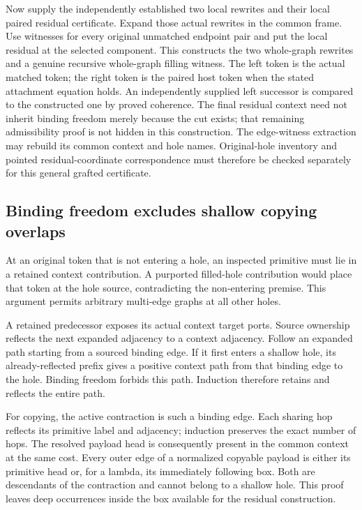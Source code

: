 Now supply the independently established two local rewrites and their local
paired residual certificate. Expand those actual rewrites in the common
frame. Use witnesses for every original unmatched endpoint pair and put the local residual
at the selected component. This constructs the two whole-graph rewrites and
a genuine recursive whole-graph filling witness. The left token is the
actual matched token; the right token is the paired host token when the
stated attachment equation holds. An independently supplied left successor
is compared to the constructed one by proved coherence. The final residual
context need not inherit binding freedom merely because the cut exists;
that remaining admissibility proof is not hidden in this construction.
The edge-witness extraction may rebuild its common context and hole names.
Original-hole inventory and pointed residual-coordinate correspondence
must therefore be checked separately for this general grafted certificate.

\subsection{Binding freedom excludes shallow copying overlaps}
At an original token that is not entering a hole, an inspected primitive
must lie in a retained context contribution. A purported filled-hole
contribution would place that token at the hole source, contradicting the
non-entering premise. This argument permits arbitrary multi-edge graphs
at all other holes.

A retained predecessor exposes its actual context target ports. Source
ownership reflects the next expanded adjacency to a context adjacency.
Follow an expanded path starting from a sourced binding edge. If it first
enters a shallow hole, its already-reflected prefix gives a positive
context path from that binding edge to the hole. Binding freedom forbids
this path. Induction therefore retains and reflects the entire path.

For copying, the active contraction is such a binding edge. Each sharing
hop reflects its primitive label and adjacency; induction preserves the
exact number of hops. The resolved payload head is consequently present
in the common context at the same cost. Every outer edge of a normalized
copyable payload is either its primitive head or, for a lambda, its
immediately following box. Both are descendants of the contraction and
cannot belong to a shallow hole. This proof leaves deep occurrences inside
the box available for the residual construction.

